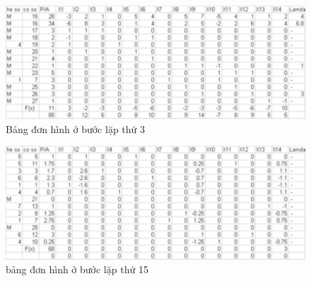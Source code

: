 \begin{verbatim}







\end{verbatim}
\begin{figure}[!ht]
\begin{center}
\includegraphics{lap3.pdf}
\caption{Bảng đơn hình ở bước lặp thứ 3}
\end{center}
\end{figure}

\begin{figure}[!ht]
\begin{center}
\includegraphics{lap15.pdf}
\caption{bảng đơn hình ở bước lặp thứ 15}
\end{center}
\end{figure}
\begin{verbatim}













\end{verbatim}
